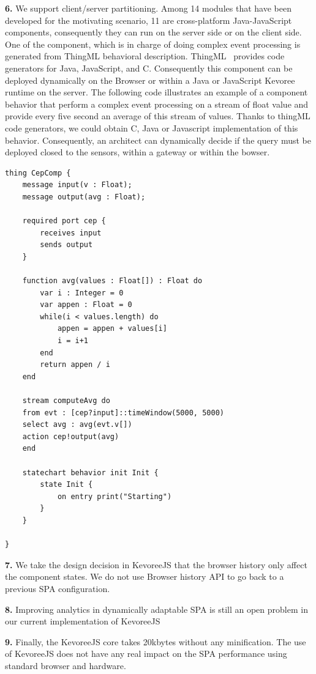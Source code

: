 \indent \textbf{6.} We support client/server partitioning. Among 14 modules that have been developed for the motivating scenario, 11 are cross-platform Java-JavaScript components, consequently they can run on the server side or on the client side.  One of the component, which is in charge of doing complex event processing is generated from ThingML behavioral description. ThingML~\cite{DBLP:conf/models/FleureyMSB11} provides code generators for Java, JavaScript, and C. Consequently this component can be deployed dynamically on the Browser or within a Java or JavaScript Kevoree runtime on the server.  The following code illustrates an example of a component behavior that perform a complex event processing on a stream of float value and provide every five second an average of this stream of values. Thanks to thingML code generators, we could obtain C, Java or Javascript implementation of this behavior. Consequently, an architect can dynamically decide if the query must be deployed closed to the sensors, within a gateway or within the bowser. 

\begin{lstlisting}[language=ThingML]
thing CepComp {
	message input(v : Float);
	message output(avg : Float);
	
	required port cep {
		receives input
		sends output	
	}
	
	function avg(values : Float[]) : Float do
		var i : Integer = 0
		var appen : Float = 0
		while(i < values.length) do
			appen = appen + values[i]
			i = i+1
		end
		return appen / i
	end
	
	stream computeAvg do
	from evt : [cep?input]::timeWindow(5000, 5000)
	select avg : avg(evt.v[])
	action cep!output(avg)
	end
	
	statechart behavior init Init {
		state Init {
			on entry print("Starting")			
		}
	}
	
}
\end{lstlisting}



\indent \textbf{7.} We take the design decision in KevoreeJS that the browser history only affect the component states. We do not use Browser history API to go back to a previous SPA configuration.

\indent \textbf{8.} Improving analytics in dynamically adaptable SPA is still an open problem in our current implementation of KevoreeJS

\indent \textbf{9.} Finally, the KevoreeJS core takes 20kbytes without any minification. The use of KevoreeJS does not have any real impact on the SPA performance using standard browser and hardware.
